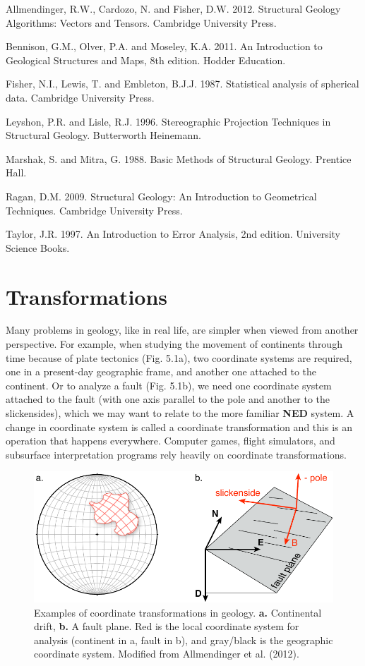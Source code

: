 \documentclass[a4paper , 12pt]{book}
\begin{document}
Allmendinger, R.W., Cardozo, N. and Fisher, D.W. 2012. Structural Geology Algorithms: Vectors and Tensors. Cambridge University Press.

Bennison, G.M., Olver, P.A. and Moseley, K.A. 2011. An Introduction to Geological Structures and Maps, 8th edition. Hodder Education.

Fisher, N.I., Lewis, T. and Embleton, B.J.J. 1987. Statistical analysis of spherical data. Cambridge University Press.

Leyshon, P.R. and Lisle, R.J. 1996. Stereographic Projection Techniques in Structural Geology. Butterworth Heinemann.

Marshak, S. and Mitra, G. 1988. Basic Methods of Structural Geology. Prentice Hall.

Ragan, D.M. 2009. Structural Geology: An Introduction to Geometrical Techniques. Cambridge University Press.

Taylor, J.R. 1997. An Introduction to Error Analysis, 2nd edition. University Science Books.

\chapter{Transformations}

Many problems in geology, like in real life, are simpler when viewed from another perspective. For example, when studying the movement of continents through time because of plate tectonics (Fig. 5.1a), two coordinate systems are required, one in a present-day geographic frame, and another one attached to the continent. Or to analyze a fault (Fig. 5.1b), we need one coordinate system attached to the fault (with one axis parallel to the pole and another to the slickensides), which we may want to relate to the more familiar \textbf{NED} system. A change in coordinate system is called a coordinate transformation and this is an operation that happens everywhere. Computer games, flight simulators, and subsurface interpretation programs rely heavily on coordinate transformations. 

 \begin{figure}[ht]
    \centering
    \includegraphics[width=12cm]{ch5f1.pdf}
    \caption{Examples of coordinate transformations in geology. \textbf{a.} Continental drift, \textbf{b.} A fault plane. Red is the local coordinate system for analysis (continent in a, fault in b), and gray/black is the geographic coordinate system. Modified from Allmendinger et al. (2012).}
\end{figure}
\end{document}
